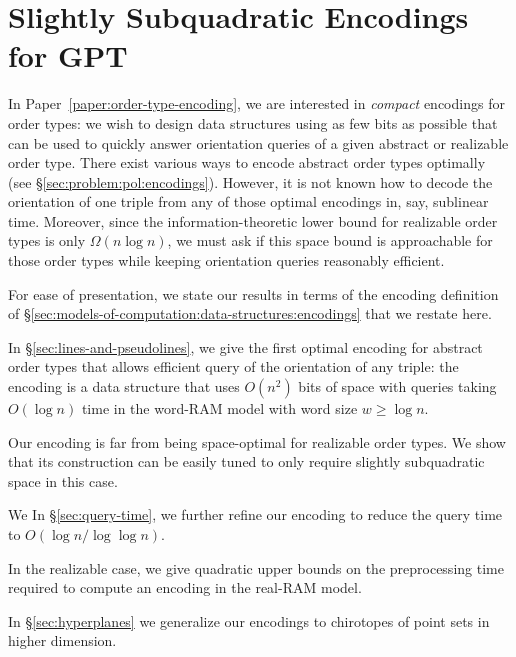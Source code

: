\section{Slightly Subquadratic Encodings for GPT}



In Paper~\ref{paper:order-type-encoding},
we are interested in \emph{compact} encodings for
order types: we wish to design data structures using as few bits as possible
that can be used to quickly answer orientation queries of a given abstract or
realizable order type.
%
There exist various ways to encode abstract order types optimally (see
\S\ref{sec:problem:pol:encodings}).
%
However, it is not known how to decode the orientation of one triple from any
of those optimal encodings in, say, sublinear time.
%
Moreover, since the information-theoretic lower bound for realizable order
types is only \(\Omega(n \log n)\), we must ask if this space bound is
approachable for those order types while keeping orientation queries reasonably
efficient.

For ease of presentation, we state our results in terms of the encoding
definition of \S\ref{sec:models-of-computation:data-structures:encodings} that
we restate here.
%
\DefinitionEncoding*

In \S\ref{sec:lines-and-pseudolines}, we
give the first optimal encoding for abstract
order types that allows efficient query of the orientation of any triple: the
encoding is a data structure that uses \( O(n^2) \) bits of space with queries
taking \(O(\log n)\) time in the word-RAM model with word size \(w \geq \log
n\).

%
Our encoding is far from being space-optimal for realizable order types.
We show that its construction can be easily tuned to only require
slightly subquadratic space in this case.

%
\ifeurocg%
We \else%
In \S\ref{sec:query-time}, we \fi%
further refine our encoding to
reduce the query time to \(O(\log{n}/\log{\log{n}})\).


%
In the realizable case, we give quadratic upper bounds on the
preprocessing time required to compute an encoding in the real-RAM model.

%
In \S\ref{sec:hyperplanes} we
generalize our encodings to chirotopes of
point sets in higher dimension.



